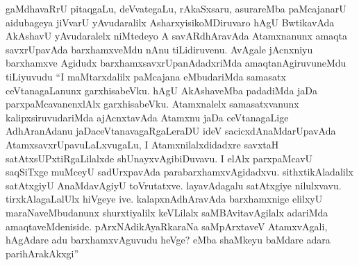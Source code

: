 \begin{artha}
  gaMdhavaRrU pitaqgaLu, deVvategaLu, rAkaSxsaru, asurareMba paMcajanarU aidubageya jiVvarU yAvudaralilx AsharxyisikoMDiruvaro hAgU BwtikavAda AkAshavU yAvudaralelx niMtedeyo A savARdhAravAda Atamxnanunx amaqta savxrUpavAda barxhamxveMdu nAnu tiLidiruvenu. AvAgale jAcnxniyu barxhamxve Agidudx barxhamxsavxrUpanAdadxriMda amaqtanAgiruvuneMdu tiLiyuvudu ``I maMtarxdalilx paMcajana eMbudariMda samasatx ceVtanagaLanunx garxhisabeVku. hAgU AkAshaveMba padadiMda jaDa parxpaMcavanenxlAlx garxhisabeVku. Atamxnalelx samasatxvanunx kalipxsiruvudariMda ajAcnxtavAda Atamxnu jaDa ceVtanagaLige AdhAranAdanu jaDaceVtanavagaRgaLeraDU ideV sacicxdAnaMdarUpavAda AtamxsavxrUpavuLaLxvugaLu, I Atamxnilalxdidadxre savxtaH satAtxsUPxtiRgaLilalxde shUnayxvAgibiDuvavu. I elAlx parxpaMcavU saqSiTxge muMceyU sadUrxpavAda parabarxhamxvAgidadxvu. sithxtikAladalilx satAtxgiyU AnaMdavAgiyU toVrutatxve. layavAdagalu satAtxgiye nilulxvavu. tirxkAlagaLalUlx hiVgeye ive. kalapxnAdhAravAda barxhamxnige elilxyU maraNaveMbudanunx shurxtiyalilx keVLilalx saMBAvitavAgilalx adariMda amaqtaveMdeniside. pArxNAdikAyaRkaraNa saMpArxtaveV AtamxvAgali, hAgAdare adu barxhamxvAguvudu heVge? eMba shaMkeyu baMdare adara parihArakAkxgi''
\end{artha}

